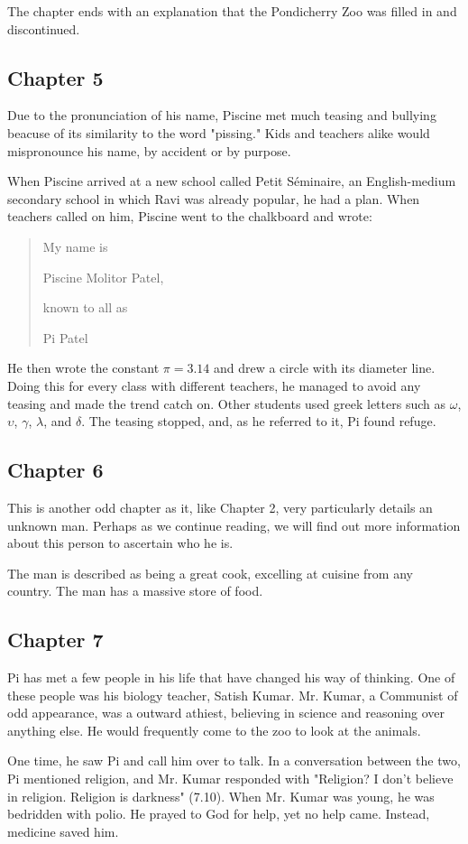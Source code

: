 \documentclass[11pt]{article}
\begin{document}
The chapter ends with an explanation that the Pondicherry Zoo was filled in and discontinued.
\subsection{Chapter 5}
\label{sec:org739247f}
Due to the pronunciation of his name, Piscine met much teasing and bullying beacuse of its similarity to the word "pissing." Kids and teachers alike would mispronounce his name, by accident or by purpose.

When Piscine arrived at a new school called Petit Séminaire, an English-medium secondary school in which Ravi was already popular, he had a plan. When teachers called on him, Piscine went to the chalkboard and wrote:
\begin{quote}
My name is

Piscine Molitor Patel,

known to all as

Pi Patel
\end{quote}
He then wrote the constant \(\pi = 3.14\) and drew a circle with its diameter line. Doing this for every class with different teachers, he managed to avoid any teasing and made the trend catch on. Other students used greek letters such as \(\omega\), \(\upsilon\), \(\gamma\), \(\lambda\), and \(\delta\). The teasing stopped, and, as he referred to it, Pi found refuge.
\subsection{Chapter 6}
\label{sec:orgdca6864}
This is another odd chapter as it, like Chapter 2, very particularly details an unknown man. Perhaps as we continue reading, we will find out more information about this person to ascertain who he is.

The man is described as being a great cook, excelling at cuisine from any country. The man has a massive store of food.
\subsection{Chapter 7}
\label{sec:org3a55c20}
Pi has met a few people in his life that have changed his way of thinking. One of these people was his biology teacher, Satish Kumar. Mr. Kumar, a Communist of odd appearance, was a outward athiest, believing in science and reasoning over anything else. He would frequently come to the zoo to look at the animals.

One time, he saw Pi and call him over to talk. In a conversation between the two, Pi mentioned religion, and Mr. Kumar responded with "Religion? I don't believe in religion. Religion is darkness" (7.10). When Mr. Kumar was young, he was bedridden with polio. He prayed to God for help, yet no help came. Instead, medicine saved him.
\end{document}

